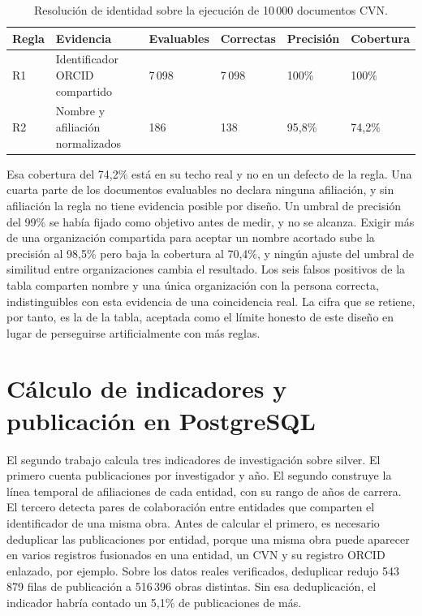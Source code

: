\begin{table}[H]
  \centering
  \small
  \renewcommand{\arraystretch}{1.2}
  \begin{tabular}{
    p{}
    >{\raggedright\arraybackslash}p{}
    p{} p{} p{} p{}}
    \hline
    \textbf{Regla} & \textbf{Evidencia} & \textbf{Evaluables} & \textbf{Correctas} & \textbf{Precisión} & \textbf{Cobertura} \\
    \hline
    R1 & Identificador ORCID compartido & 7\,098 & 7\,098 & 100\% & 100\% \\
    R2 & Nombre y afiliación normalizados & 186 & 138 & 95,8\% & 74,2\% \\
    \hline
  \end{tabular}
  \caption{Resolución de identidad sobre la ejecución de 10\,000 documentos CVN.}
  \label{tab:tfm_resolucion_resultados}
\end{table}

Esa cobertura del 74,2\% está en su techo real y no en un defecto de la
regla. Una cuarta parte de los documentos evaluables no declara ninguna
afiliación, y sin afiliación la regla no tiene evidencia posible por
diseño. Un umbral de precisión del 99\% se había fijado como objetivo
antes de medir, y no se alcanza. Exigir más de una organización compartida
para aceptar un nombre acortado sube la precisión al 98,5\% pero baja la
cobertura al 70,4\%, y ningún ajuste del umbral de similitud entre
organizaciones cambia el resultado. Los seis falsos positivos de la tabla
comparten nombre y una única organización con la persona correcta,
indistinguibles con esta evidencia de una coincidencia real. La cifra que
se retiene, por tanto, es la de la tabla, aceptada como el límite honesto
de este diseño en lugar de perseguirse artificialmente con más reglas.

\section{Cálculo de indicadores y publicación en PostgreSQL}
\label{sec:procesamiento_gold}

El segundo trabajo calcula tres indicadores de investigación sobre silver.
El primero cuenta publicaciones por investigador y año. El segundo
construye la línea temporal de afiliaciones de cada entidad, con su rango
de años de carrera. El tercero detecta pares de colaboración entre
entidades que comparten el identificador de una misma obra. Antes de
calcular el primero, es necesario deduplicar las publicaciones por
entidad, porque una misma obra puede aparecer en varios registros
fusionados en una entidad, un CVN y su registro ORCID enlazado, por
ejemplo. Sobre los datos reales verificados, deduplicar redujo 543\,879
filas de publicación a 516\,396 obras distintas. Sin esa deduplicación, el
indicador habría contado un 5,1\% de publicaciones de más.

